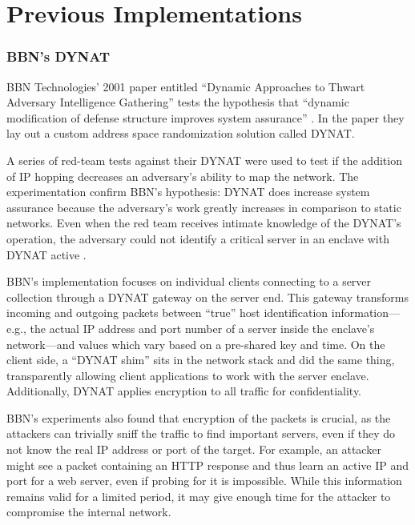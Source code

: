 \section{Previous Implementations}
\label{sec:related_research}
\subsubsection{BBN's \acf{DYNAT}}
\par BBN Technologies' 2001 paper entitled ``Dynamic Approaches to Thwart Adversary Intelligence Gathering'' tests the hypothesis that ``dynamic modification of defense structure improves system assurance'' \cite{BBNDYNAT}. In the paper they lay out a custom address space randomization solution called \ac{DYNAT}.

\par A series of red-team tests against their \ac{DYNAT} were used to test if the addition of \ac{IP} hopping decreases an adversary's ability to map the network. The experimentation confirm BBN's hypothesis: DYNAT does increase system assurance because the adversary's work greatly increases in comparison to static networks. Even when the red team receives intimate knowledge of the DYNAT's operation, the adversary could not identify a critical server in an enclave with DYNAT active \cite{BBNDYNAT}.

\par BBN's implementation focuses on individual clients connecting to a server collection through a DYNAT gateway on the server end. This gateway transforms incoming and outgoing packets between ``true'' host identification information---e.g., the actual \ac{IP} address and port number of a server inside the enclave's network---and values which vary based on a pre-shared key and time. On the client side, a ``DYNAT shim'' sits in the network stack and did the same thing, transparently allowing client applications to work with the server enclave. Additionally, DYNAT applies encryption to all traffic for confidentiality.

\par BBN's experiments also found that encryption of the packets is crucial, as the attackers can trivially sniff the traffic to find important servers, even if they do not know the real IP address or port of the target. For example, an attacker might see a packet containing an \ac{HTTP} response and thus learn an active IP and port for a web server, even if probing for it is impossible. While this information remains valid for a limited period, it may give enough time for the attacker to compromise the internal network.

